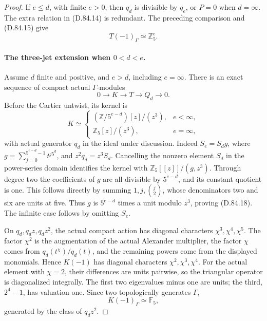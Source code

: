 \begin{proof}
If \(e\le d\), with finite \(e>0\), then \(q_d\) is
divisible by \(q_e\), or \(P=0\) when \(d=\infty\).
The extra relation in (D.84.14) is redundant. The preceding
comparison and (D.84.15) give
\[
                         T(-1)_\Gamma\simeq\mathbb Z_5^e.
                                                                  \tag{D.84.16}
\]

\paragraph{The three-jet extension when \(0<d<e\).}
Assume \(d\) finite and positive, and \(e>d\), including
\(e=\infty\). There is an exact sequence of compact actual
\(\Gamma\)-modules
\[
                 0\longrightarrow K\longrightarrow T
                       \longrightarrow Q_d\longrightarrow0.
                                                                  \tag{D.84.17}
\]
Before the Cartier untwist, its kernel is
\[
 K\simeq
 \begin{cases}
  (\mathbb Z/5^{e-d})[z]/(z^3),&e<\infty,\\
  \mathbb Z_5[z]/(z^3),&e=\infty,
 \end{cases}                                                     \tag{D.84.18}
\]
with actual generator \(q_d\) in the ideal under discussion.
Indeed \(S_e=S_d g\), where
\(g=\sum_{j=0}^{5^{e-d}-1}t^{j5^d}\), and
\(z^2q_d=z^3S_d\). Cancelling the nonzero element \(S_d\)
in the power-series domain identifies the kernel with
\(\mathbb Z_5[[z]]/(g,z^3)\). Through degree two the
coefficients of \(g\) are all divisible by \(5^{e-d}\),
and its constant quotient is one. This follows directly
by summing \(1,j,\binom j2\), whose denominators two
and six are units at five. Thus \(g\) is
\(5^{e-d}\) times a unit modulo \(z^3\), proving (D.84.18).
The infinite case follows by omitting \(S_e\).

On \(q_d,q_dz,q_dz^2\), the actual compact action has
diagonal characters \(\chi^3,\chi^4,\chi^5\).
The factor \(\chi^2\) is the augmentation of the actual
Alexander multiplier, the factor \(\chi\) comes from
\(q_d(t^\chi)/q_d(t)\), and the remaining powers come
from the displayed monomials. Hence \(K(-1)\) has
diagonal characters \(\chi^2,\chi^3,\chi^4\).
For the actual element with \(\chi=2\), their differences
are units pairwise, so the triangular operator is
diagonalized integrally. The first two eigenvalues minus
one are units; the third, \(2^4-1\), has valuation one.
Since two topologically generates \(\Gamma\),
\[
                         K(-1)_\Gamma\simeq\mathbb F_5,
                                                                  \tag{D.84.19}
\]
generated by the class of \(q_dz^2\).


\end{proof}
